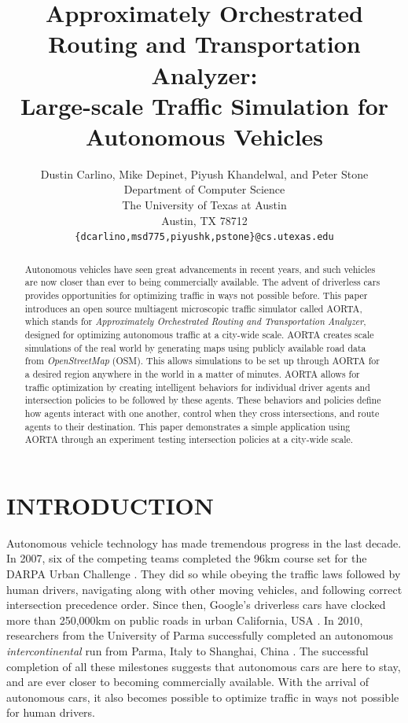 \documentclass[letterpaper, 10 pt, conference]{ieeeconf}  %
\title{\LARGE \bf
Approximately Orchestrated Routing and Transportation Analyzer:\\
Large-scale Traffic Simulation for Autonomous Vehicles
}
\author{Dustin Carlino, Mike Depinet, Piyush Khandelwal, and Peter Stone\\
        Department of Computer Science\\
        The University of Texas at Austin\\
        Austin, TX 78712\\
        {\tt \small\{dcarlino,msd775,piyushk,pstone\}@cs.utexas.edu}}
\begin{document}
\maketitle
\thispagestyle{empty}
\pagestyle{empty}


\begin{abstract} 

Autonomous vehicles have seen great advancements in recent years, and such
vehicles are now closer than ever to being commercially available. The advent of
driverless cars provides opportunities for optimizing traffic in ways not
possible before. This paper introduces an open source multiagent microscopic
traffic simulator called AORTA, which stands for \textit{Approximately
Orchestrated Routing and Transportation Analyzer}, designed for optimizing
autonomous traffic at a city-wide scale. AORTA creates scale simulations of the
real world by generating maps using publicly available road data from
\textit{OpenStreetMap} (OSM). This allows simulations to be set up through
AORTA for a desired region anywhere in the world in a matter of minutes. AORTA
allows for traffic optimization by creating intelligent behaviors for
individual driver agents and intersection policies to be followed by these
agents. These behaviors and policies define how agents interact with one
another, control when they cross intersections, and route agents to their
destination. This paper demonstrates a simple application using AORTA through
an experiment testing intersection policies at a city-wide scale.

\end{abstract}


\section{INTRODUCTION}
\label{sec:introduction}

Autonomous vehicle technology has made tremendous progress in the last decade.
In 2007, six of the competing teams completed the 96km course set for the DARPA
Urban Challenge \cite{spectrumUrbanChallenge2007}. They did so while
obeying the traffic laws followed by human drivers, navigating along with other
moving vehicles, and following correct intersection precedence order. Since
then, Google's driverless cars have clocked more than 250,000km on public roads
in urban California, USA \cite{tedThrun2011}. In 2010, researchers from the
University of Parma successfully completed an autonomous
\textit{intercontinental} run from Parma, Italy to Shanghai, China
\cite{cnnVislab2010}. The successful completion of all these milestones
suggests that autonomous cars are here to stay, and are ever closer to becoming
commercially available. With the arrival of autonomous cars, it also becomes
possible to optimize traffic in ways not possible for human drivers. 
\end{document}
